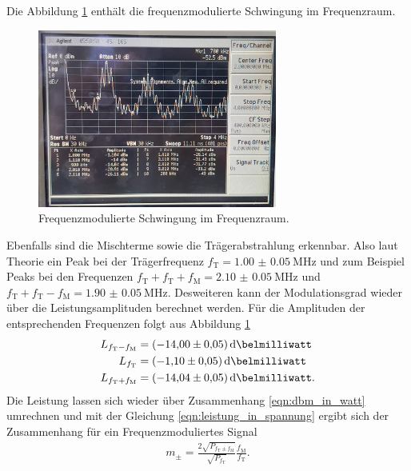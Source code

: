 Die Abbildung \ref{fig:frequenz_freq} enthält die frequenzmodulierte Schwingung
im Frequenzraum.
\begin{figure}
  \centering
  \includegraphics[width=0.7\textwidth]{spec/frequenzmodulation_bereich_fresh_cool.jpg}
  \caption{Frequenzmodulierte
Schwingung im Frequenzraum.}
\label{fig:frequenz_freq}
\end{figure}
Ebenfalls sind die Mischterme sowie die Trägerabstrahlung erkennbar.
Also laut Theorie ein Peak bei der Trägerfrequenz $f_{\text{T}}=\SI{1.00(5)}{\mega\hertz}$
und zum Beispiel Peaks bei den Frequenzen
$f_{\text{T}}+f_{\text{T}}+f_{\text{M}} = \SI{2.10(5)}{\mega\hertz}$
und $f_{\text{T}}+f_{\text{T}}-f_{\text{M}} = \SI{1.90(5)}{\mega\hertz}$.
Desweiteren kann der Modulationsgrad wieder
über die Leistungsamplituden berechnet werden.
Für die Amplituden der entsprechenden Frequenzen
folgt aus Abbildung \ref{fig:frequenz_freq}
\begin{align}
L_{f_{\text{T}}-f_{\text{M}}}&=\SI{-14.00(5)}{\deci\belmilliwatt}\notag\\
L_{f_{\text{T}}}&=\SI{-1.10(5)}{\deci\belmilliwatt}\\
L_{f_{\text{T}}+f_{\text{M}}}&=\SI{-14.04(5)}{\deci\belmilliwatt}.\notag
\end{align}
Die Leistung lassen sich wieder über Zusammenhang \eqref{eqn:dbm_in_watt}
umrechnen und mit der Gleichung
\eqref{eqn:leistung_in_spannung} ergibt sich der Zusammenhang
für ein Frequenzmoduliertes Signal
\begin{align}
m_\pm=\frac{2\sqrt{P_{f_{\text{T}}\pm f_{\text{M}} } } }{\sqrt{P_{f_{\text{T}} } }}  \frac{f_{\text{M}}}{f_{\text{T}}}. \label{eqn:m_leistung_f}
\end{align}




